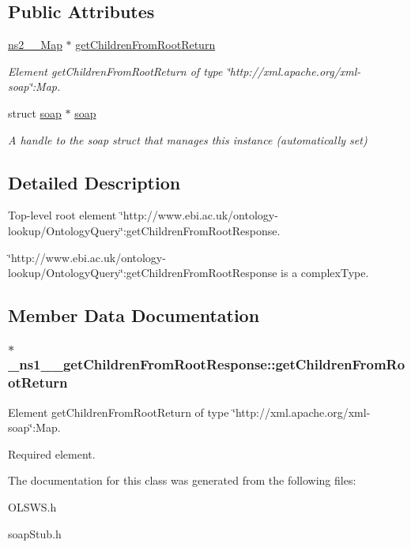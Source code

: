 \subsection*{Public Attributes}
\begin{DoxyCompactItemize}
\item 
\hyperlink{classns2____Map}{ns2\_\-\_\-Map} $\ast$ \hyperlink{class__ns1____getChildrenFromRootResponse_ac319dd78547315c618a8090c1bed61c4}{getChildrenFromRootReturn}
\begin{DoxyCompactList}\small\item\em Element getChildrenFromRootReturn of type \char`\"{}http://xml.apache.org/xml-\/soap\char`\"{}:Map. \end{DoxyCompactList}\item 
\hypertarget{class__ns1____getChildrenFromRootResponse_a7417fd1f2850a37a21d0b29a5beff6d7}{
struct \hyperlink{class__ns1____getChildrenFromRootResponse_a7417fd1f2850a37a21d0b29a5beff6d7}{soap} $\ast$ \hyperlink{class__ns1____getChildrenFromRootResponse_a7417fd1f2850a37a21d0b29a5beff6d7}{soap}}
\label{class__ns1____getChildrenFromRootResponse_a7417fd1f2850a37a21d0b29a5beff6d7}

\begin{DoxyCompactList}\small\item\em A handle to the soap struct that manages this instance (automatically set) \end{DoxyCompactList}\end{DoxyCompactItemize}


\subsection{Detailed Description}
Top-\/level root element \char`\"{}http://www.ebi.ac.uk/ontology-\/lookup/OntologyQuery\char`\"{}:getChildrenFromRootResponse. 

\char`\"{}http://www.ebi.ac.uk/ontology-\/lookup/OntologyQuery\char`\"{}:getChildrenFromRootResponse is a complexType. 

\subsection{Member Data Documentation}
\hypertarget{class__ns1____getChildrenFromRootResponse_ac319dd78547315c618a8090c1bed61c4}{
\subsubsection[{getChildrenFromRootReturn}]{ $\ast$ {\bf \_\-ns1\_\-\_\-getChildrenFromRootResponse::getChildrenFromRootReturn}}}
\label{class__ns1____getChildrenFromRootResponse_ac319dd78547315c618a8090c1bed61c4}


Element getChildrenFromRootReturn of type \char`\"{}http://xml.apache.org/xml-\/soap\char`\"{}:Map. 

Required element. 

The documentation for this class was generated from the following files:\begin{DoxyCompactItemize}
\item 
OLSWS.h\item 
soapStub.h\end{DoxyCompactItemize}
